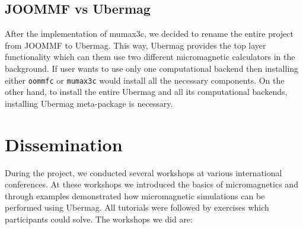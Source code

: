 \documentclass{deliverablereport}
\begin{document}
\subsection{JOOMMF vs Ubermag}

After the implementation of mumax3c, we decided to rename the entire project from JOOMMF to Ubermag. This way, Ubermag provides the top layer functionality which can them use two different micromagnetic calculators in the background. If user wants to use only one computational backend then installing either \texttt{oommfc} or \texttt{mumax3c} would install all the necessary components. On the other hand, to install the entire Ubermag and all its computational backends, installing Ubermag meta-package is necessary.

\section{Dissemination}

During the project, we conducted several workshops at various international conferences. At these workshops we introduced the basics of micromagnetics and through examples demonstrated how micromagnetic simulations can be performed using Ubermag. All tutorials were followed by exercises which participants could solve. The workshops we did are:
\end{document}

